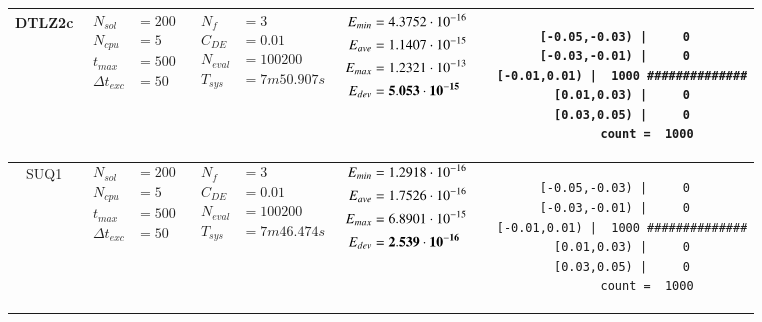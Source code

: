 \begin{table*} [!t]
\begin{tabular}[c]{ccccc}
\hline



DTLZ2c
&
{$\!\begin{aligned}
    N_{sol}        &= 200 \\
	N_{cpu}        &= 5 \\
	t_{max}        &= 500 \\
	\Delta t_{exc} &= 50
\end{aligned}$}
&
{$\!\begin{aligned}
	N_{f}    &= 3 \\
	C_{DE}   &= 0.01 \\
	N_{eval} &= 100200 \\
	T_{sys}  &= 7m50.907s
\end{aligned}$}
&
{$\!\begin{aligned}
    E_{min} &= 4.3752\cdot 10^{-16} \\
    E_{ave} &= 1.1407\cdot 10^{-15} \\
    E_{max} &= 1.2321\cdot 10^{-13} \\
    E_{dev} &= {\bf 5.053\cdot 10^{-15}}
\end{aligned}$}
&
\begin{minipage}{4.1cm} \fontsize{5pt}{6pt}
\begin{verbatim}
 [-0.05,-0.03) |     0 
 [-0.03,-0.01) |     0 
  [-0.01,0.01) |  1000 ##############
   [0.01,0.03) |     0 
   [0.03,0.05) |     0 
         count =  1000
 \end{verbatim}
\end{minipage} \\

\hline



SUQ1
&
{$\!\begin{aligned}
    N_{sol}        &= 200 \\
	N_{cpu}        &= 5 \\
	t_{max}        &= 500 \\
	\Delta t_{exc} &= 50
\end{aligned}$}
&
{$\!\begin{aligned}
	N_{f}    &= 3 \\
	C_{DE}   &= 0.01 \\
	N_{eval} &= 100200 \\
	T_{sys}  &= 7m46.474s
\end{aligned}$}
&
{$\!\begin{aligned}
    E_{min} &= 1.2918\cdot 10^{-16} \\
    E_{ave} &= 1.7526\cdot 10^{-16} \\
    E_{max} &= 6.8901\cdot 10^{-15} \\
    E_{dev} &= {\bf 2.539\cdot 10^{-16}}
\end{aligned}$}
&
\begin{minipage}{4.1cm} \fontsize{5pt}{6pt}
\begin{verbatim}
 [-0.05,-0.03) |     0 
 [-0.03,-0.01) |     0 
  [-0.01,0.01) |  1000 ##############
   [0.01,0.03) |     0 
   [0.03,0.05) |     0 
         count =  1000
 \end{verbatim}
\end{minipage} \\


\end{tabular}
\end{table*}
